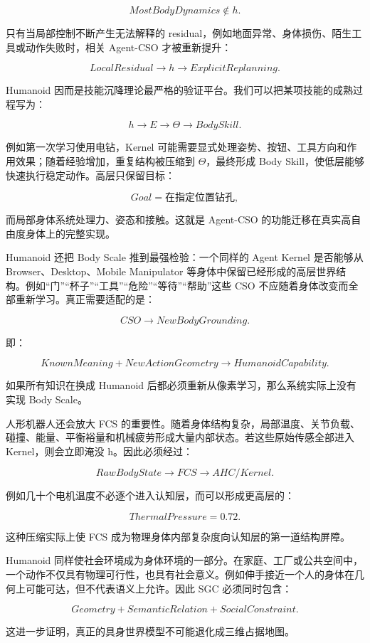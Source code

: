 $$
MostBodyDynamics\notin h.
$$

只有当局部控制不断产生无法解释的 residual，例如地面异常、身体损伤、陌生工具或动作失败时，相关 Agent-CSO 才被重新提升：

$$
LocalResidual
\rightarrow
h
\rightarrow
ExplicitReplanning.
$$

Humanoid 因而是技能沉降理论最严格的验证平台。我们可以把某项技能的成熟过程写为：

$$
h
\rightarrow
E
\rightarrow
\Theta
\rightarrow
BodySkill.
$$

例如第一次学习使用电钻，Kernel 可能需要显式处理姿势、按钮、工具方向和作用效果；随着经验增加，重复结构被压缩到 $\Theta$，最终形成 Body Skill，使低层能够快速执行稳定动作。高层只保留目标：

$$
Goal=\text{在指定位置钻孔},
$$

而局部身体系统处理力、姿态和接触。这就是 Agent-CSO 的功能迁移在真实高自由度身体上的完整实现。

Humanoid 还把 Body Scale 推到最强检验：一个同样的 Agent Kernel 是否能够从 Browser、Desktop、Mobile Manipulator 等身体中保留已经形成的高层世界结构。例如“门”“杯子”“工具”“危险”“等待”“帮助”这些 CSO 不应随着身体改变而全部重新学习。真正需要适配的是：

$$
CSO
\rightarrow
NewBodyGrounding.
$$

即：

$$
KnownMeaning
+
NewActionGeometry
\rightarrow
HumanoidCapability.
$$

如果所有知识在换成 Humanoid 后都必须重新从像素学习，那么系统实际上没有实现 Body Scale。

人形机器人还会放大 FCS 的重要性。随着身体结构复杂，局部温度、关节负载、碰撞、能量、平衡裕量和机械疲劳形成大量内部状态。若这些原始传感全部进入 Kernel，则会立即淹没 h。因此必须经过：

$$
RawBodyState
\rightarrow
FCS
\rightarrow
AHC/Kernel.
$$

例如几十个电机温度不必逐个进入认知层，而可以形成更高层的：

$$
ThermalPressure=0.72.
$$

这种压缩实际上使 FCS 成为物理身体内部复杂度向认知层的第一道结构屏障。

Humanoid 同样使社会环境成为身体环境的一部分。在家庭、工厂或公共空间中，一个动作不仅具有物理可行性，也具有社会意义。例如伸手接近一个人的身体在几何上可能可达，但不代表语义上允许。因此 SGC 必须同时包含：

$$
Geometry
+
SemanticRelation
+
SocialConstraint.
$$

这进一步证明，真正的具身世界模型不可能退化成三维占据地图。

